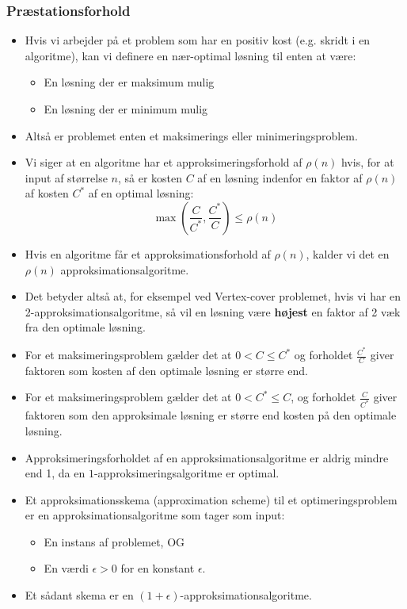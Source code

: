 \begin{frame}[allowframebreaks]
  \frametitle{Præstationsforhold}
  \begin{itemize}
    \item Hvis vi arbejder på et problem som har en positiv kost (e.g. skridt i en algoritme), kan vi definere en nær-optimal løsning til enten at være:
          \begin{itemize}
            \item En løsning der er maksimum mulig
            \item En løsning der er minimum mulig
          \end{itemize}
    \item Altså er problemet enten et maksimerings eller minimeringsproblem.
    \item Vi siger at en algoritme har et approksimeringsforhold af $\rho(n)$ hvis, for at input af størrelse $n$, så er kosten $C$ af en løsning indenfor en faktor af \(\rho(n)\) af kosten $C^{*}$ af en optimal løsning:
          \begin{equation}
\max \left( \frac{C}{C^{*}}, \frac{C^{*}}{C} \right) \le \rho(n)
          \end{equation}
    \item Hvis en algoritme får et approksimationsforhold af \(\rho(n)\), kalder vi det en $\rho(n)$ approksimationsalgoritme.
    \item Det betyder altså at, for eksempel ved Vertex-cover problemet, hvis vi har en 2-approksimationsalgoritme, så vil en løsning være \textbf{højest} en faktor af 2 væk fra den optimale løsning.
    \item For et maksimeringsproblem gælder det at $0 < C \le C^{{*}}$ og forholdet $\frac{C^{*}}{C}$ giver faktoren som kosten af den optimale løsning er større end.
    \item For et maksimeringsproblem gælder det at $0 < C^{*} \le C$, og forholdet $\frac{C}{C^{*}}$ giver faktoren som den approksimale løsning er større end kosten på den optimale løsning.
    \item Approksimeringsforholdet af en approksimationsalgoritme er aldrig mindre end 1, da en $1$-approksimeringsalgoritme er optimal.
    \item Et approksimationsskema (approximation scheme) til et optimeringsproblem er en approksimationsalgoritme som tager som input:
          \begin{itemize}
            \item En instans af problemet, OG
            \item En værdi $\epsilon > 0$ for en konstant \(\epsilon\).
          \end{itemize}

    \item Et sådant skema er en $(1+\epsilon)$-approksimationsalgoritme.
  \end{itemize}
\end{frame}

